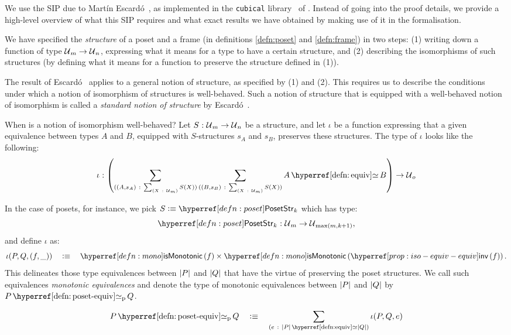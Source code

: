 We use the SIP due to Martín Escardó~\cite{escardo-uf-intro}, as implemented in the
\texttt{cubical} library~\cite{agda-cubical} of \veragda{}. Instead of going into the
proof details, we provide a high-level overview of what this SIP requires and what exact
results we have obtained by making use of it in the \veragda{} formalisation.

We have specified the \emph{structure} of a poset and a frame (in definitions
\ref{defn:poset} and \ref{defn:frame}) in two steps: (1) writing down a function of type
$\mathcal{U}{}_m \rightarrow \mathcal{U}{}_n$, expressing what it means for a type to have a certain structure,
and (2) describing the isomorphisms of such structures (by defining what it means for a
function to preserve the structure defined in (1)).

The result of Escardó~\cite{escardo-uf-intro} applies to a general notion of structure, as
specified by (1) and (2). This requires us to describe the conditions under which a notion
of isomorphism of structures is well-behaved. Such a notion of structure that is equipped
with a well-behaved notion of isomorphism is called a \emph{standard notion of structure}
by Escard\'{o}~\cite{escardo-uf-intro}.

When is a notion of isomorphism well-behaved? Let $S\hspace{0.1mm}:\hspace{0.1mm}\mathcal{U}{}_m \rightarrow \mathcal{U}{}_n$ be a
structure, and let $\iota$ be a function expressing that a given equivalence between types $A$
and $B$, equipped with $S$-structures $s_A$ and $s_B$, preserves these structures. The
type of $\iota$ looks like the following:
\begin{equation*}
  \oftyI{\iota}{%
    \left(
      \sigmaty{(A, s_A)}{\sigmaty{X}{\univ{}_m}{S(X)}}{%
        \sigmaty{(B, s_B)}{\sigmaty{X}{\univ{}_m}{S(X)}}{%
          \typequiv{A}{B}
        }
      }
    \right)
    \rightarrow
    \univ{}_o
  }
\end{equation*}

In the case of posets, for instance, we pick $S \is \posetstrnm{}_k$ which has type:
\begin{equation*}
  \oftyI{\posetstrnm{}_k}{\univ{}_m \rightarrow \univ{}_{\max(m, k+1)}},
\end{equation*}
and define $\iota$ as:
\begin{equation*}
  \iota(P, Q, (f , \_)) \quad\is\quad \ismonotonic{f} \times \ismonotonic{\invequiv{f}}  .
\end{equation*}
This delineates those type equivalences between $\left| P \right|$ and $\left| Q \right|$ that have the
virtue of preserving the poset structures. We call such equivalences
\emph{monotonic equivalences} and denote the type of monotonic equivalences between
$\left| P \right|$ and $\left| Q \right|$ by $\posetequiv{P}{Q}$.
\begin{defn}\label{defn:poset-equiv}
  \begin{equation*}
    \posetequiv{P}{Q} \quad\is\quad \sigmaty{e}{\typequiv{\abs{P}}{\abs{Q}}}{\iota(P, Q, e)}
  \end{equation*}
\end{defn}

